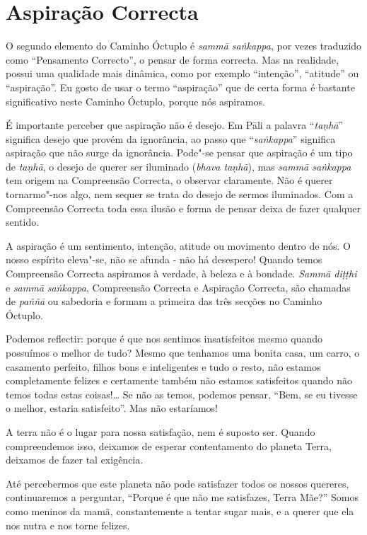 \section{Aspiração Correcta}

O segundo elemento do Caminho Óctuplo é \emph{sammā saṅkappa}, por vezes traduzido como
“Pensamento Correcto”, o pensar de forma correcta. Mas na realidade, possui uma
qualidade mais dinâmica, como por exemplo “intenção”, “atitude” ou “aspiração”.
Eu gosto de usar o termo “aspiração” que de certa forma é bastante significativo
neste Caminho Óctuplo, porque nós aspiramos.

É importante perceber que aspiração não é desejo. Em Pāli a palavra
“\emph{taṇhā}” significa desejo que provém da ignorância, ao passo que
“\emph{saṅkappa}” significa aspiração que não surge da ignorância. Pode"-se
pensar que aspiração é um tipo de \emph{taṇhā}, o desejo de querer ser iluminado
(\emph{bhava taṇhā}), mas \emph{sammā saṅkappa} tem origem na Compreensão
Correcta, o observar claramente. Não é querer tornarmo"-nos algo, nem sequer se
trata do desejo de sermos iluminados. Com a Compreensão Correcta toda essa ilusão
e forma de pensar deixa de fazer qualquer sentido.

A aspiração é um sentimento, intenção, atitude ou movimento dentro de nós. O
nosso espírito eleva"-se, não se afunda - não há desespero! Quando temos
Compreensão Correcta aspiramos à verdade, à beleza e à bondade. \emph{Sammā
  diṭṭhi} e \emph{sammā saṅkappa}, Compreensão Correcta e Aspiração Correcta,
são chamadas de \emph{paññā} ou sabedoria e formam a primeira das três secções
no Caminho Óctuplo.

\sectionBreak

Podemos reflectir: porque é que nos sentimos insatisfeitos mesmo quando
possuímos o melhor de tudo? Mesmo que tenhamos uma bonita casa, um carro, o
casamento perfeito, filhos bons e inteligentes e tudo o resto, não estamos
completamente felizes e certamente também não estamos satisfeitos quando não
temos todas estas coisas!\ldots{} Se não as temos, podemos pensar, “Bem, se eu
tivesse o melhor, estaria satisfeito”. Mas não estaríamos!

A terra não é o lugar
para nossa satisfação, nem é suposto ser. Quando compreendemos isso, deixamos de
esperar contentamento do planeta Terra, deixamos de fazer tal exigência.

Até percebermos que este planeta não pode satisfazer todos os nossos quereres,
continuaremos a perguntar, “Porque é que não me satisfazes, Terra Mãe?” Somos
como meninos da mamã, constantemente a tentar sugar mais, e a querer que ela nos
nutra e nos torne felizes.


